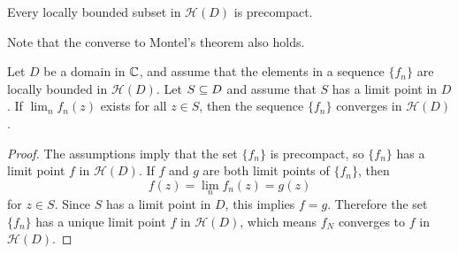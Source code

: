 \begin{corollary}
Every locally bounded subset in $\mathcal{H}(D)$ is precompact.
\end{corollary}
Note that the converse to Montel's theorem also holds.
\begin{theorem}
Let $D$ be a domain in $\mathbb{C}$, and assume that the elements in a sequence $\{f_n\}$ are locally bounded in $\mathcal{H}(D)$. Let $S\subseteq D$ and assume that $S$ has a limit point in $D$. If $\lim_{n}f_n(z)$ exists for all $z\in S$, then the sequence $\{f_n\}$ converges in $\mathcal{H}(D)$.
\end{theorem}
\begin{proof}
The assumptions imply that the set $\{f_n\}$ is precompact, so $\{f_n\}$ has a limit point $f$ in $\mathcal{H}(D)$. If $f$ and $g$ are both limit points of $\{f_n\}$, then
\[f(z)=\lim_nf_n(z)=g(z)\]
for $z\in S$. Since $S$ has a limit point in $D$, this implies $f=g$. Therefore the set $\{f_n\}$ has a unique limit point $f$ in $\mathcal{H}(D)$, which means $f_N$ converges to $f$ in $\mathcal{H}(D)$.
\end{proof}
